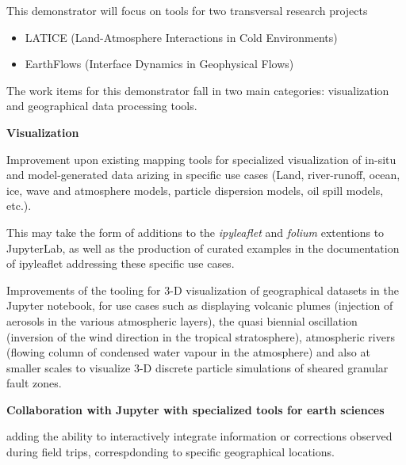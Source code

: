 \begin{task}[
  title=Geosciences application,
  id=geoscience,
  lead=UIO,
  PM=24,
  wphases={0-48},
  partners={UIO,QS,SRL}
]
This demonstrator will focus on tools for two transversal research projects

\begin{itemize}
\item LATICE (Land-Atmosphere Interactions in Cold Environments)
\item EarthFlows (Interface Dynamics in Geophysical Flows)
\end{itemize}

The work items for this demonstrator fall in two main categories:
visualization and geographical data processing tools.

\textbf{Visualization}

\begin{compactitem}
  \item Improvement upon existing mapping tools for specialized
    visualization of in-situ and model-generated data arizing in
    specific use cases (Land, river-runoff, ocean, ice, wave and
    atmosphere models, particle dispersion models, oil spill models,
    etc.).

    This may take the form of additions to the \emph{ipyleaflet} and
    \emph{folium} extentions to JupyterLab, as well as the production of
    curated examples in the documentation of ipyleaflet addressing these
    specific use cases.

  \item Improvements of the tooling for 3-D visualization of
    geographical datasets in the Jupyter notebook, for use cases such as
    displaying volcanic plumes (injection of aerosols in the various
    atmospheric layers), the quasi biennial oscillation (inversion of
    the wind direction in the tropical stratosphere), atmospheric rivers
    (flowing column of condensed water vapour in the atmosphere) and
    also at smaller scales to visualize 3-D discrete particle simulations
    of sheared granular fault zones.
\end{compactitem}

\textbf{Collaboration with Jupyter with specialized tools for earth sciences}

\begin{compactitem}
  \item adding the ability to interactively integrate information or corrections
    observed during field trips, correspdonding to specific geographical locations.



\end{compactitem}
\end{task}
